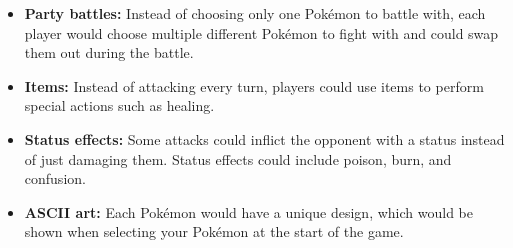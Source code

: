 \documentclass{article}
\begin{document}
\begin{itemize}
  \item \textbf{Party battles:} Instead of choosing only one Pok\'emon to battle with, each player would choose multiple different Pok\'emon to fight with and could swap them out during the battle.

  \item \textbf{Items:} Instead of attacking every turn, players could use items to perform special actions such as healing.

  \item \textbf{Status effects:} Some attacks could inflict the opponent with a status instead of just damaging them. Status effects could include poison, burn, and confusion.

  \item \textbf{ASCII art:} Each Pok\'emon would have a unique design, which would be shown when selecting your Pok\'emon at the start of the game.
\end{itemize}
\end{document}
